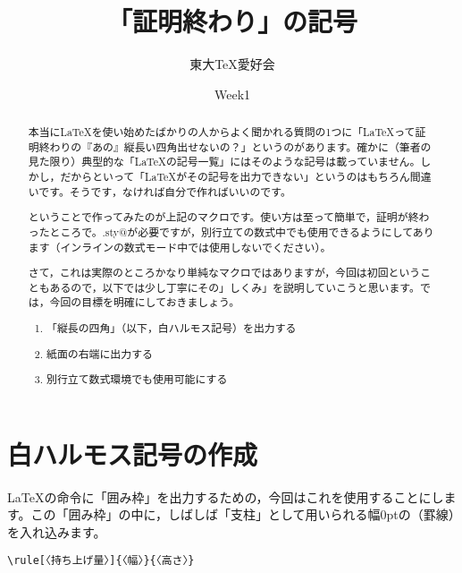 \documentclass[autodetect-engine,dvipdfmx]{jsarticle}
\title{「証明終わり」の記号}
\author{東大TeX愛好会}
\date{Week1}
\begin{document}
\maketitle

\begin{abstract}

本当に\LaTeX を使い始めたばかりの人からよく聞かれる質問の1つに「\LaTeX って証明終わりの『あの』縦長い四角出せないの？」というのがあります。確かに（筆者の見た限り）典型的な「\LaTeX の記号一覧」にはそのような記号は載っていません。しかし，だからといって「\LaTeX がその記号を出力できない」というのはもちろん間違いです。そうです，なければ自分で作ればいいのです。

ということで作ってみたのが上記のマクロです。使い方は至って簡単で，証明が終わったところで\verb@{}。\verb@amsmath.sty@が必要ですが，別行立ての数式中でも使用できるようにしてあります（インラインの数式モード中では使用しないでください）。

さて，これは実際のところかなり単純なマクロではありますが，今回は初回ということもあるので，以下では少し丁寧にその」しくみ」を説明していこうと思います。では，今回の目標を明確にしておきましょう。

\begin{enumerate}
\item 「縦長の四角」（以下，白ハルモス記号）を出力する
\item 紙面の右端に出力する
\item 別行立て数式環境でも使用可能にする
\end{enumerate}

\end{abstract}

\part{白ハルモス記号の作成}

\LaTeX の命令に「囲み枠」を出力するための\verb@{}，今回はこれを使用することにします。この「囲み枠」の中に，しばしば「支柱」として用いられる幅0ptの\verb@{}（罫線）を入れ込みます。

\verb@{}

\begin{tcolorbox}

\begin{verbatim}
\rule[〈持ち上げ量〉]{〈幅〉}{〈高さ〉}
\end{verbatim}

\end{tcolorbox}
\end{document}

